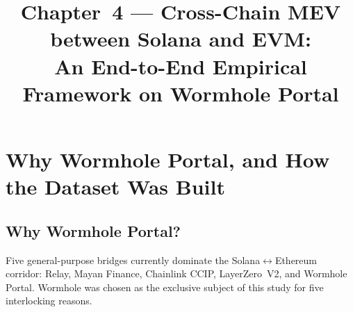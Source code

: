 \documentclass[11pt,a4paper]{article}
\title{\textbf{Chapter~4 \;\;---\;\; Cross-Chain MEV between Solana and EVM: \\
    An End-to-End Empirical Framework on Wormhole Portal}}
\author{}
\date{}
\begin{document}
\maketitle

\section{Why Wormhole Portal, and How the Dataset Was Built}
\label{sec:ch4-data}

\subsection{Why Wormhole Portal?}

Five general-purpose bridges currently dominate the Solana$\leftrightarrow$Ethereum
corridor: Relay, Mayan Finance, Chainlink CCIP, LayerZero~V2, and Wormhole
Portal. Wormhole was chosen as the exclusive subject of this study for five
interlocking reasons.
\end{document}
